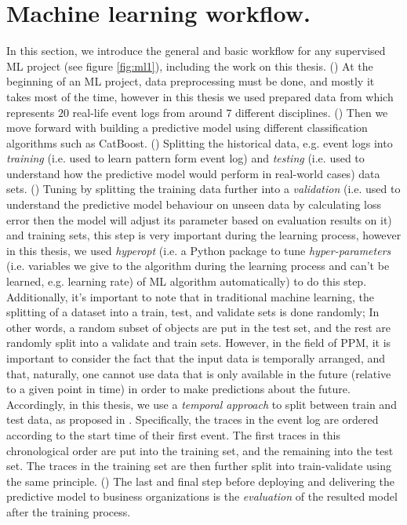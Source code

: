 \section{Machine learning workflow.}\label{tmp}
In this section, we introduce the general and basic workflow for any supervised ML project (see figure \ref{fig:ml1}), including the work on this thesis. () At the beginning of an ML project, data preprocessing must be done, and mostly it takes most of the time, however in this thesis we used prepared data from \cite{teinemaa2019outcome} which represents $20$ real-life event logs from around $7$ different disciplines. () Then we move forward with building a predictive model using different classification algorithms such as CatBoost. () Splitting the historical data, e.g. event logs into \textit{training} (i.e. used to learn pattern form event log) and \textit{testing} (i.e. used to understand how the predictive model would perform in real-world cases) data sets. () Tuning by splitting the training data further into a \textit{validation} (i.e. used to understand the predictive model behaviour on unseen data by calculating loss error then the model will adjust its parameter based on evaluation results on it) and training sets, this step is very important during the learning process, however in this thesis, we used \textit{hyperopt} \cite{bergstra2013hyperopt} (i.e. a Python package to tune \textit{hyper-parameters} (i.e. variables we give to the algorithm during the learning process and can’t be learned, e.g. learning rate) of ML algorithm automatically) to do this step. Additionally, it's important to note that in traditional machine learning, the splitting of a dataset into a train, test, and validate sets is done randomly; In other words, a random subset of objects are put in the test set, and the rest are randomly split into a validate and train sets. However, in the field of PPM, it is important to consider the fact that the input data is temporally arranged, and that, naturally, one cannot use data that is only available in the future (relative to a given point in time) in order to make predictions about the future. Accordingly, in this thesis, we use a \textit{temporal approach} to split between train and test data, as proposed in \cite{teinemaa2019outcome}. Specifically, the traces in the event log are ordered according to the start time of their first event. The first traces in this chronological order are put into the training set, and the remaining into the test set. The traces in the training set are then further split into train-validate using the same principle. () The last and final step before deploying and delivering the predictive model to business organizations is the \textit{evaluation} of the resulted model after the training process.





